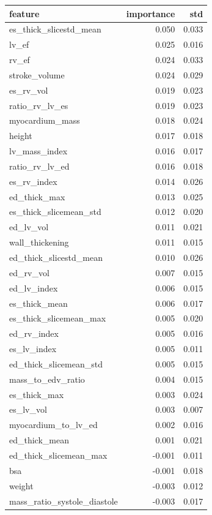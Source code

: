 \begin{tabular}{lrr}
\toprule
feature & importance & std \\
\midrule
es\_thick\_slicestd\_mean & 0.050 & 0.033 \\
lv\_ef & 0.025 & 0.016 \\
rv\_ef & 0.024 & 0.033 \\
stroke\_volume & 0.024 & 0.029 \\
es\_rv\_vol & 0.019 & 0.023 \\
ratio\_rv\_lv\_es & 0.019 & 0.023 \\
myocardium\_mass & 0.018 & 0.024 \\
height & 0.017 & 0.018 \\
lv\_mass\_index & 0.016 & 0.017 \\
ratio\_rv\_lv\_ed & 0.016 & 0.018 \\
es\_rv\_index & 0.014 & 0.026 \\
ed\_thick\_max & 0.013 & 0.025 \\
es\_thick\_slicemean\_std & 0.012 & 0.020 \\
ed\_lv\_vol & 0.011 & 0.021 \\
wall\_thickening & 0.011 & 0.015 \\
ed\_thick\_slicestd\_mean & 0.010 & 0.026 \\
ed\_rv\_vol & 0.007 & 0.015 \\
ed\_lv\_index & 0.006 & 0.015 \\
es\_thick\_mean & 0.006 & 0.017 \\
es\_thick\_slicemean\_max & 0.005 & 0.020 \\
ed\_rv\_index & 0.005 & 0.016 \\
es\_lv\_index & 0.005 & 0.011 \\
ed\_thick\_slicemean\_std & 0.005 & 0.015 \\
mass\_to\_edv\_ratio & 0.004 & 0.015 \\
es\_thick\_max & 0.003 & 0.024 \\
es\_lv\_vol & 0.003 & 0.007 \\
myocardium\_to\_lv\_ed & 0.002 & 0.016 \\
ed\_thick\_mean & 0.001 & 0.021 \\
ed\_thick\_slicemean\_max & -0.001 & 0.011 \\
bsa & -0.001 & 0.018 \\
weight & -0.003 & 0.012 \\
mass\_ratio\_systole\_diastole & -0.003 & 0.017 \\
\bottomrule
\end{tabular}
